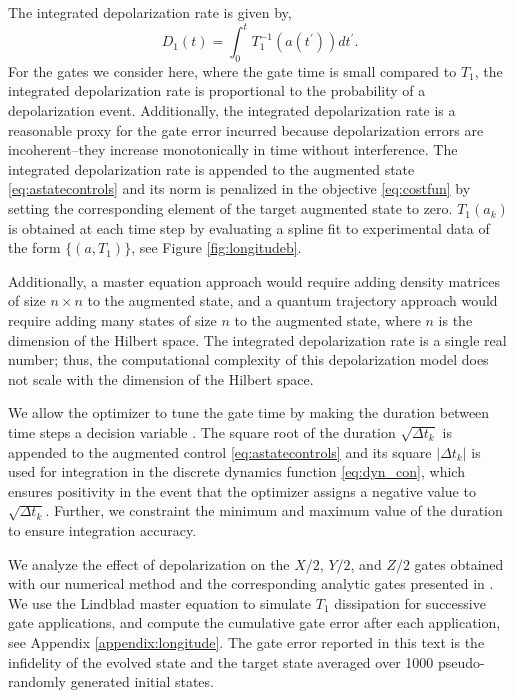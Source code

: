 The integrated depolarization rate is given by,
\begin{equation}
  D_{1}(t) = \int_{0}^{t} T_{1}^{-1}(a(t^{\prime})) dt^{\prime}.
\end{equation}
For the gates we consider here, where the gate time is small compared to $T_{1}$,
the integrated depolarization rate is proportional to the probability of a depolarization event.
Additionally, the integrated depolarization rate is a reasonable proxy for the gate error incurred
because depolarization errors are incoherent--they increase monotonically in time without interference.
The integrated depolarization rate is appended to the augmented state \eqref{eq:astatecontrols}
and its norm is penalized in the objective \eqref{eq:costfun} by setting
the corresponding element of the target augmented state to zero.
$T_{1}(a_{k})$ is obtained at each time step by evaluating
a spline fit to experimental data of the form $\{(a, T_{1})\}$,
see Figure \ref{fig:longitudeb}.

Additionally, a master equation approach would require adding
density matrices of size $n \times n$
to the augmented state, and a quantum trajectory approach
would require adding many states of size $n$ to the augmented state,
where $n$ is the dimension of the Hilbert space.
The integrated depolarization rate is a single
real number; thus, the computational complexity of this
depolarization model does not scale
with the dimension of the Hilbert space.

We allow the optimizer to tune the gate time by
making the duration between time steps
a decision variable \cite{howell2019altro}. 
The square root of the duration $\sqrt{\Delta t_{k}}$
is appended to the augmented control \eqref{eq:astatecontrols}
and its square $\lvert \Delta t_{k} \rvert$ is used
for integration in the discrete dynamics function \eqref{eq:dyn_con},
which ensures positivity in the event that
the optimizer assigns a negative value to $\sqrt{\Delta t_{k}}$.
Further, we constraint the minimum and maximum value of the
duration to ensure integration accuracy.

We analyze the effect of depolarization on
the $X/2$, $Y/2$, and $Z/2$ gates obtained with
our numerical method and the corresponding analytic gates presented in \cite{zhang2020universal}.
We use the Lindblad master equation to simulate $T_{1}$ dissipation for successive
gate applications, and compute the cumulative gate error
after each application, see Appendix \ref{appendix:longitude}.
The gate error reported in this text is the infidelity
of the evolved state and the target state averaged over 1000 pseudo-randomly
generated initial states.

